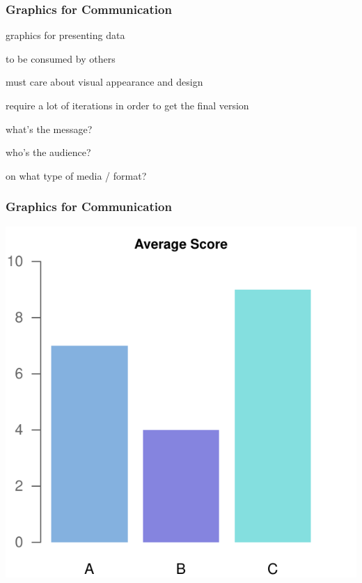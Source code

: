 \documentclass[12pt]{beamer}\usepackage[]{graphicx}\usepackage[]{color}
\newenvironment{knitrout}{}{} %
\begin{document}

\begin{frame}
\frametitle{Graphics for Communication}

\bi
  \item graphics for presenting data
  \item to be consumed by others
  \item must care about visual appearance and design
  \item require a lot of iterations in order to get the final version
  \item what's the message? 
  \item who's the audience?
  \item on what type of media / format?
\ei

\end{frame}


\begin{frame}
\frametitle{Graphics for Communication}

\begin{knitrout}\footnotesize
{}\color{fgcolor}

{\centering \includegraphics[width=.7\linewidth,height=.6\linewidth]{figure/unnamed-chunk-9-1} 

}



\end{knitrout}

\end{frame}

\end{document}
